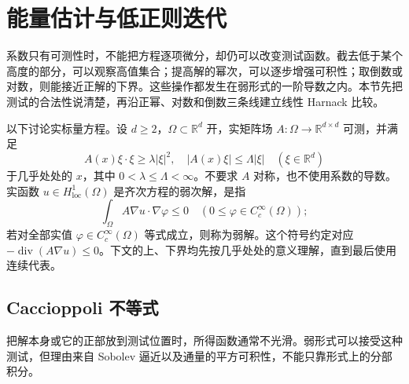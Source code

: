 \section{能量估计与低正则迭代}
\label{b2:sec:H201}

系数只有可测性时，不能把方程逐项微分，却仍可以改变测试函数。截去低于某个高度的部分，可以观察高值集合；提高解的幂次，可以逐步增强可积性；取倒数或对数，则能接近正解的下界。这些操作都发生在弱形式的一阶导数之内。本节先把测试的合法性说清楚，再沿正幂、对数和倒数三条线建立线性 Harnack 比较。

\ProseParagraphBreak

以下讨论实标量方程。设 \(d\geq2\)，\(\Omega\subset\mathbb R^d\) 开，实矩阵场 \(A:\Omega\to\mathbb R^{d\times d}\) 可测，并满足
\[
 A(x)\xi\cdot\xi\geq\lambda|\xi|^2,
 \quad |A(x)\xi|\leq\Lambda|\xi|
 \quad(\xi\in\mathbb R^d)
\]
于几乎处处的 \(x\)，其中 \(0<\lambda\leq\Lambda<\infty\)。不要求 \(A\) 对称，也不使用系数的导数。实函数 \(u\in H^1_{\mathrm{loc}}(\Omega)\) 是齐次方程的弱次解，是指
\[
 \int_\Omega A\nabla u\cdot\nabla\varphi\leq0
 \quad(0\leq\varphi\in C_c^\infty(\Omega));
\]
若对全部实值 \(\varphi\in C_c^\infty(\Omega)\) 等式成立，则称为弱解。这个符号约定对应 \(-\operatorname{div}(A\nabla u)\leq0\)。下文的上、下界均先按几乎处处的意义理解，直到最后使用连续代表。

\subsection{Caccioppoli 不等式}
\label{b2:subsec:H20101}

把解本身或它的正部放到测试位置时，所得函数通常不光滑。弱形式可以接受这种测试，但理由来自 Sobolev 逼近以及通量的平方可积性，不能只靠形式上的分部积分。

